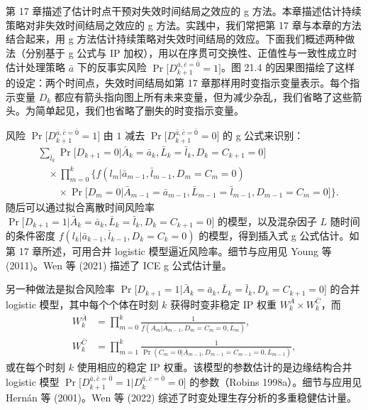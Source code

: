\begin{techpoint}[时变处理的生存分析]
第 17 章描述了估计时点干预对失效时间结局之效应的 g 方法。本章描述估计持续策略对非失效时间结局之效应的 g 方法。实践中，我们常把第 17 章与本章的方法结合起来，用 g 方法估计持续策略对失效时间结局的效应。下面我们概述两种做法（分别基于 g 公式与 IP 加权），用以在序贯可交换性、正值性与一致性成立时估计处理策略 $\bar a$ 下的反事实风险 $\Pr\big[D^{\bar a,\bar c=\bar 0}_{k+1}=1\big]$。图 21.4 的因果图描绘了这样的设定：两个时间点，失效时间结局如第 17 章那样用时变指示变量表示。每个指示变量 $D_k$ 都应有箭头指向图上所有未来变量，但为减少杂乱，我们省略了这些箭头。为简单起见，我们也省略了删失的时变指示变量。

风险 $\Pr\big[D^{\bar a,\bar c=\bar 0}_{k+1}=1\big]$ 由 $1$ 减去 $\Pr\big[D^{\bar a,\bar c=\bar 0}_{k+1}=0\big]$ 的 g 公式来识别：
\[
\begin{aligned}
&\sum_{\bar l_k}\Pr\big[D_{k+1}=0|\bar A_k=\bar a_k,\bar L_k=\bar l_k,D_k=C_{k+1}=0\big]\\
&\quad\times\prod_{m=0}^{k}\Big\{f(l_m|\bar a_{m-1},\bar l_{m-1},D_m=C_m=0)\\
&\qquad\times\Pr\big[D_m=0|\bar A_{m-1}=\bar a_{m-1},\bar L_{m-1}=\bar l_{m-1},D_{m-1}=C_m=0\big]\Big\}.
\end{aligned}
\]
随后可以通过拟合离散时间风险率 $\Pr\big[D_{k+1}=1|\bar A_k=\bar a_k,\bar L_k=\bar l_k,D_k=C_{k+1}=0\big]$ 的模型，以及混杂因子 $L$ 随时间的条件密度 $f(l_k|\bar a_{k-1},\bar l_{k-1},D_k=C_k=0)$ 的模型，得到插入式 g 公式估计。如第 17 章所述，可用合并 logistic 模型逼近风险率。细节与应用见 Young 等 (2011)。Wen 等 (2021) 描述了 ICE g 公式估计量。

另一种做法是拟合风险率 $\Pr\big[D_{k+1}=1|\bar A_k=\bar a_k,\bar L_k=\bar l_k,D_k=C_{k+1}=0\big]$ 的合并 logistic 模型，其中每个个体在时刻 $k$ 获得时变非稳定 IP 权重 $W_k^{\bar A}\times W_k^{\bar C}$，而
\[
\begin{aligned}
W_k^{\bar A}&=\prod_{m=0}^{k}\frac{1}{f(A_m|\bar A_{m-1},D_m=C_m=0,\bar L_m)},\\
W_k^{\bar C}&=\prod_{m=1}^{k}\frac{1}{\Pr(C_m=0|\bar A_{m-1},D_{m-1}=C_{m-1}=0,\bar L_{m-1})},
\end{aligned}
\]
或在每个时刻 $k$ 使用相应的稳定 IP 权重。该模型的参数估计的是边缘结构合并 logistic 模型 $\Pr\big[D^{\bar a,\bar c=\bar 0}_{k+1}=1|D^{\bar a,\bar c=\bar 0}_k=0\big]$ 的参数（Robins 1998a）。细节与应用见 Hernán 等 (2001)。Wen 等 (2022) 综述了时变处理生存分析的多重稳健估计量。
\end{techpoint}

